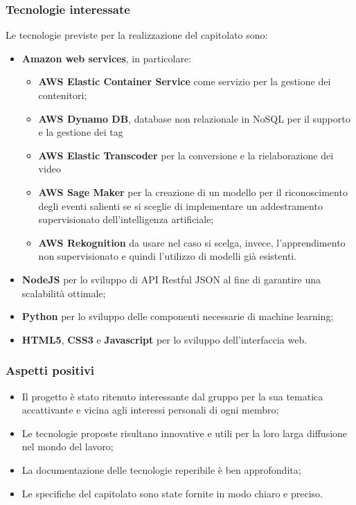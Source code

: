 \subsubsection{Tecnologie interessate}
Le tecnologie previste per la realizzazione del capitolato sono:
\begin{itemize}
	\item \textbf{Amazon web services}, in particolare:
	\begin{itemize}
		\item \textbf{AWS Elastic Container Service} come servizio per la gestione dei contenitori;
		\item \textbf{AWS Dynamo DB}, database non relazionale in NoSQL per il supporto e la gestione dei tag
		\item \textbf{AWS Elastic Transcoder} per la conversione e la rielaborazione dei video
		\item \textbf{AWS Sage Maker} per la creazione di un modello per il riconoscimento degli eventi salienti se si sceglie di implementare un addestramento supervisionato dell'intelligenza artificiale;
		\item \textbf{AWS Rekognition} da usare nel caso si scelga, invece, l'apprendimento non supervisionato e quindi l'utilizzo di modelli già esistenti.
	\end{itemize}
	\item \textbf{NodeJS} per lo sviluppo di API Restful JSON al fine di garantire una scalabilità ottimale;
	\item \textbf{Python} per lo sviluppo delle componenti necessarie di machine learning;
	\item \textbf{HTML5}, \textbf{CSS3} e \textbf{Javascript} per lo sviluppo dell'interfaccia web. 
\end{itemize}
\subsubsection{Aspetti positivi}
\begin{itemize}
	\item Il progetto è stato ritenuto interessante dal gruppo per la sua tematica accattivante e vicina agli interessi personali di ogni membro;
	\item Le tecnologie proposte risultano innovative e utili per la loro larga diffusione nel mondo del lavoro;
	\item La documentazione delle tecnologie reperibile è ben approfondita;
	\item Le specifiche del capitolato sono state fornite in modo chiaro e preciso. 
\end{itemize}
